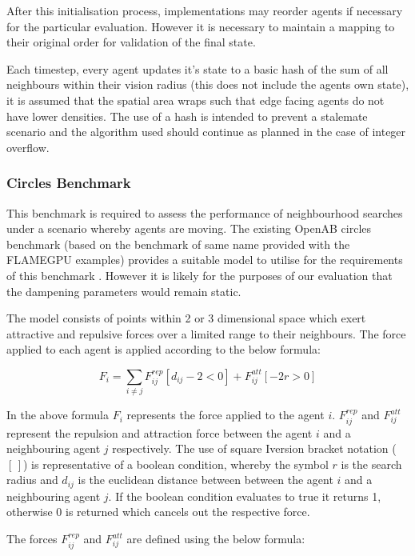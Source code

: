         After this initialisation process, implementations may reorder agents if necessary for the particular evaluation. However it is necessary to maintain a mapping to their original order for validation of the final state.
        
        Each timestep, every agent updates it's state to a basic hash of the sum of all neighbours within their vision radius (this does not include the agents own state), it is assumed that the spatial area wraps such that edge facing agents do not have lower densities. The use of a hash is intended to prevent a stalemate scenario and the algorithm used should continue as planned in the case of integer overflow.
        
      \subsubsection*{Circles Benchmark}
        This benchmark is required to assess the performance of neighbourhood searches under a scenario whereby agents are moving. The existing OpenAB circles benchmark (based on the benchmark of same name provided with the FLAMEGPU examples) provides a suitable model to utilise for the requirements of this benchmark \cite{OPENAB-CIRCLES}. However it is likely for the purposes of our evaluation that the dampening parameters would remain static.
        
        The model consists of points within 2 or 3 dimensional space which exert attractive and repulsive forces over a limited range to their neighbours. The force applied to each agent is applied according to the below formula:
        
        \[F_{i} = \sum\limits_{i \neq j} F_{ij}^{rep}[d_{ij} - 2 < 0] + F_{ij}^{att}[ - 2r > 0]\]
        
        In the above formula $F_{i}$ represents the force applied to the agent $i$. $F_{ij}^{rep}$ and $F_{ij}^{att}$ represent the repulsion and attraction force between the agent $i$ and a neighbouring agent $j$ respectively. The use of square Iversion bracket notation ($[\,]$) is representative of a boolean condition, whereby the symbol $r$ is the search radius and $d_{ij}$ is the euclidean distance between between the agent $i$ and a neighbouring agent $j$. If the boolean condition evaluates to true it returns 1, otherwise 0 is returned which cancels out the respective force.
        
        The forces $F_{ij}^{rep}$ and $F_{ij}^{att}$ are defined using the below formula:
        
